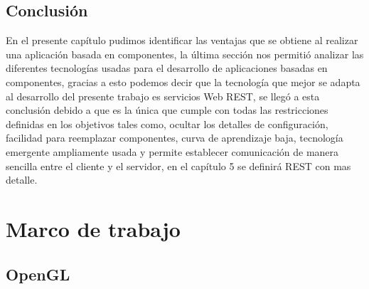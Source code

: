 \documentclass[12pt,a4paper,spanish,openany]{book}
\begin{document}
\section{Conclusión}
En el presente capítulo pudimos identificar las ventajas que se obtiene al
realizar una aplicación basada en componentes, la última sección  nos permitió
analizar las diferentes tecnologías usadas para el desarrollo de aplicaciones
basadas en componentes, gracias a esto podemos decir que la tecnología que mejor
se adapta al desarrollo del presente trabajo es servicios Web REST, se llegó a
esta conclusión debido a que es la única que cumple con todas las restricciones
definidas en los objetivos tales como, ocultar los detalles de configuración,
facilidad para reemplazar componentes, curva de aprendizaje baja, tecnología
emergente ampliamente usada y permite establecer comunicación de manera sencilla
entre el cliente y el servidor, en el capítulo 5 se definirá REST con mas
detalle.



\chapter{Marco de trabajo}
\section{OpenGL}
\end{document}
